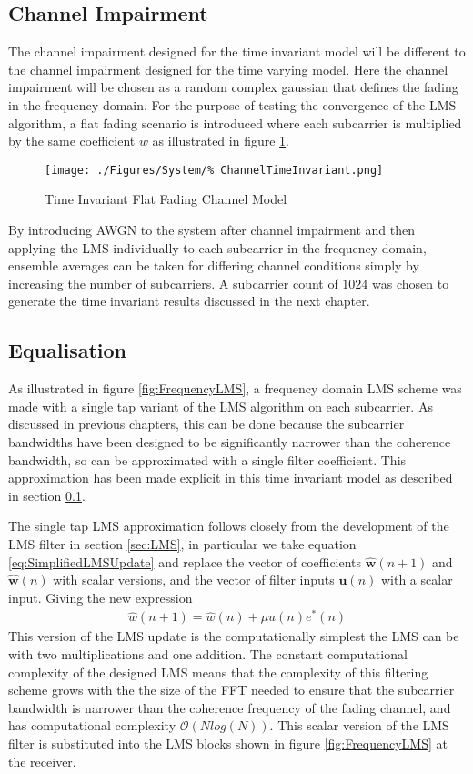 \subsection{Channel Impairment}
\label{sec:TIChannelImpairment}
The channel impairment designed for the time invariant model %
will be different to the channel impairment designed for the time varying model. %
Here the channel impairment will be chosen as a random complex gaussian that %
defines the fading in the frequency domain. For the purpose of testing the convergence %
of the LMS algorithm, a flat fading scenario is introduced where each subcarrier %
is multiplied by the same coefficient $w$ as illustrated in figure \ref{fig:TIChannel}.
\begin{figure}[ht]
	\texttt{[image: ./Figures/System/\%
	ChannelTimeInvariant.png]}
	\caption{Time Invariant Flat Fading Channel Model}
	\label{fig:TIChannel}
\end{figure}
By introducing AWGN to the system after channel impairment and then %
applying the LMS individually to each subcarrier in the frequency domain, %
ensemble averages can be taken for differing channel conditions simply by %
increasing the number of subcarriers. A subcarrier count of $1024$ was %
chosen to generate the time invariant results discussed in the next chapter. %

\subsection{Equalisation}
\label{subsec:Equalisation}
As illustrated in figure \ref{fig:FrequencyLMS}, a frequency domain %
LMS scheme was made with a single tap variant of the LMS algorithm on %
each subcarrier. As discussed in previous chapters, this can be done %
because the subcarrier bandwidths have been designed to be significantly %
narrower than the coherence bandwidth, so can be approximated with a %
single filter coefficient. This approximation has been made explicit in this %
time invariant model as described in section \ref{sec:TIChannelImpairment}. %

The single tap LMS approximation follows closely from the development of the %
LMS filter in section \ref{sec:LMS}, in particular we take equation \ref{eq:SimplifiedLMSUpdate} %
and replace the vector of coefficients $\hat{\mathbf{w}}(n+1)$ and $\hat{\mathbf{w}}(n)$ with scalar %
versions, and the vector of filter inputs $\mathbf{u}(n)$ with a scalar input. Giving the %
new expression
\begin{align}
	\hat{w}(n+1) = \hat{w}(n) + \mu u(n) e^{*}(n)
	\label{eq:ScalarLMS}
\end{align}
This version of the LMS update is the computationally simplest %
the LMS can be with two multiplications and one addition. %
The constant computational complexity of the designed LMS means %
that the complexity of this filtering scheme grows with the %
the size of the FFT needed to ensure that the subcarrier bandwidth %
is narrower than the coherence frequency of the fading channel, and %
has computational complexity $\mathcal{O}(N log(N))$. This scalar version %
of the LMS filter is substituted into the LMS blocks shown in figure %
\ref{fig:FrequencyLMS} at the receiver.

